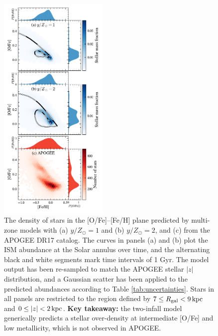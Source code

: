 \documentclass[twocolumn,twocolappendix,linenumbers]{aastex631}
\newcommand{\kpc}{\,{\rm kpc}}
\newcommand{\onecolumn}{0.47\textwidth}
\begin{document}
\begin{figure}
    \centering
    \includegraphics[width=\onecolumn]{figures/ofe_feh_density.pdf}
    \caption{The density of stars in the [O/Fe]--[Fe/H] plane predicted by multi-zone models with (a) $y/Z_\odot=1$ and (b) $y/Z_\odot=2$, and (c) from the APOGEE DR17 catalog. The curves in panels (a) and (b) plot the ISM abundance at the Solar annulus over time, and the alternating black and white segments mark time intervals of {1 Gyr}. The model output has been re-sampled to match the APOGEE stellar $|z|$ distribution, and a Gaussian scatter has been applied to the predicted abundances according to Table \ref{tab:uncertainties}. Stars in all panels are restricted to the region defined by $7\leq R_{\rm gal}< 9\kpc$ and $0\leq|z|<2\kpc$. {\bf Key takeaway:} the two-infall model generically predicts a stellar over-density at intermediate [O/Fe] and low metallicity, which is not observed in APOGEE.}

\end{figure}
\end{document}
